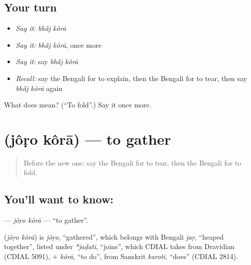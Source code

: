 \subsection*{Your turn}
\begin{itemize}
\raggedright
  \item \emph{Say it:} \emph{bhā̃j kôrā}
  \item \emph{Say it:} \emph{bhā̃j kôrā}, once more
  \item \emph{Say it:} say \emph{bhā̃j kôrā}
  \item \emph{Recall:} say the Bengali for to explain, then the Bengali for to tear, then say \emph{bhā̃j kôrā} again
\end{itemize}

\begin{tcolorbox}[breakable,colback=teal!4,colframe=teal!35!black,title={Before you move on}]
What does   mean? (\textquotedblleft{}To fold\textquotedblright{}.) Say it once more.
\end{tcolorbox}
\section[\texorpdfstring{\bn{জড়ো} \bn{করা} (jôṛo kôrā)}{জড়ো করা (jôṛo kôrā)}]{  (jôṛo kôrā) — to gather}

\label{lesson:BN-C182-joro-kora}



\begin{quote}
Before the new one: say the Bengali for to tear, then the Bengali for to fold.
\end{quote}

\subsection*{You'll want to know:  }
\textbf{ } — \emph{jôṛo kôrā} — \textquotedblleft{}to gather\textquotedblright{}.

\begin{cousinweb}
\textbf{ } (\emph{jôṛo kôrā}) is \emph{jôṛo}, \textquotedblleft{}gathered\textquotedblright{}, which belongs with Bengali \emph{jaṛ}, \textquotedblleft{}heaped together\textquotedblright{}, listed under \emph{*jaḍati}, \textquotedblleft{}joins\textquotedblright{}, which CDIAL takes from Dravidian (CDIAL 5091), + \emph{kôrā}, \textquotedblleft{}to do\textquotedblright{}, from Sanskrit \emph{karoti}, \textquotedblleft{}does\textquotedblright{} (CDIAL 2814).
\end{cousinweb}

